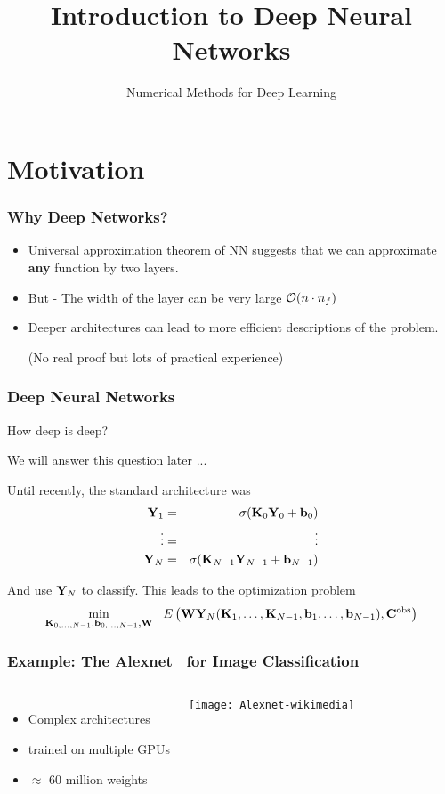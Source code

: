 \documentclass[12pt,fleqn,handout]{beamer}
\date{}
\title{Introduction to Deep Neural Networks}
\subtitle{Numerical Methods for Deep Learning}
\begin{document}
\makebeamertitle

\section{Motivation} %
\label{sec:motivation}
\begin{frame}[fragile]\frametitle{Why Deep Networks?}

\begin{itemize}
\item Universal approximation theorem of NN suggests that we can approximate {\bf any} function by
two layers.
\item But - The width of the layer can be very large ${\cal O}(n\cdot n_f)$
\item
Deeper architectures can lead to more efficient descriptions of the problem.

(No real proof but lots of practical experience)
\end{itemize}


\end{frame}

\begin{frame}[fragile]\frametitle{Deep Neural Networks}

How deep is deep?

We will answer this question later ...

\bigskip
\pause

Until recently, the standard architecture was
\begin{eqnarray*}
{\bf Y}_1 &=& \sigma({\bf K}_0{\bf Y}_0 + {\bf b}_0) \\
\vdots & =&  \vdots \\
 {\bf Y}_N &=& \sigma({\bf K}_{N-1}  {\bf Y}_{N-1}+ {\bf b}_{N-1})
 \end{eqnarray*}

\bigskip
\pause

And use ${\bf Y}_N$ to classify. This leads to the optimization problem
$$ 
\min_{{\bf K}_{0,\ldots,N-1},{\bf b}_{0,\ldots,N-1},{\bf W}} \ \ E\left({\bf W} {\bf Y}_N({\bf K}_1,\ldots,{\bf K}_{N-1},{\bf b}_1,\ldots, {\bf b}_{N-1}) , {\bf C}^{\rm obs} \right)
 $$

\end{frame}

\begin{frame}[fragile]\frametitle{Example: The Alexnet~\cite{KrizhevskySutskeverHinton2012} for Image Classification}

\begin{columns}
	\begin{itemize}
		\item Complex architectures 
		\item trained on multiple GPUs
		\item $\approx $ 60 million weights
	\end{itemize}	
\begin{center}
\texttt{[image: Alexnet-wikimedia]}
\end{center}
\end{columns}




\end{frame}
\end{document}
